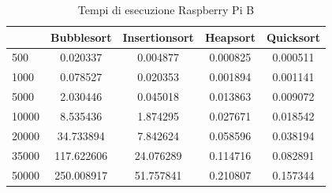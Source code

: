 \documentclass[12pt,a4paper]{report}
\begin{document}
\begin{table}[h]
		\centering
		\begin{tabular}		{| l | c | c | c | c |}
		\hline
		      & Bubblesort & Insertionsort & Heapsort & Quicksort \\ \hline
500   & 0.020337      & 0.004877      & 0.000825 & 0.000511     \\ \hline
1000  & 0.078527	    & 0.020353      & 0.001894 & 0.001141     \\ \hline
5000  & 2.030446      & 0.045018     & 0.013863  & 0.009072   \\ \hline
10000 & 8.535436      & 1.874295     & 0.027671 & 0.018542     \\ \hline
20000 & 34.733894   & 7.842624      & 0.058596  & 0.038194   \\ \hline
35000 & 117.622606     & 24.076289     & 0.114716  & 0.082891   \\ \hline
50000 & 250.008917     & 51.757841   & 0.210807  & 0.157344  \\ \hline

		\end{tabular}
		\caption{Tempi di esecuzione Raspberry Pi B}
		\label{Tab:RaspSorting}
			\end{table}
\end{document}
